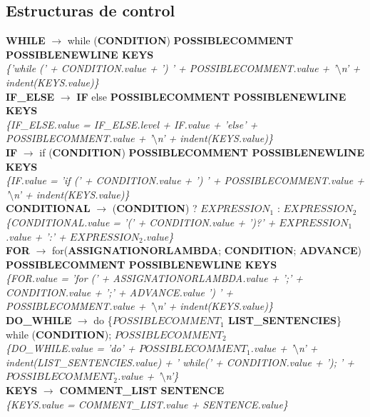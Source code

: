 \documentclass[10pt,a4paper]{article}
\begin{document}
\subsection{Estructuras de control}
\textbf{WHILE} $\rightarrow$ while (\textbf{CONDITION}) \textbf{POSSIBLECOMMENT POSSIBLENEWLINE KEYS} \\
\textit{\{'while (' + CONDITION.value + ') ' + POSSIBLECOMMENT.value + '$\setminus$n' + indent(KEYS.value)\}} \\

\textbf{IF\_ELSE} $\rightarrow$ \textbf{IF} else \textbf{POSSIBLECOMMENT POSSIBLENEWLINE KEYS} \\
\textit{\{IF\_ELSE.value = IF\_ELSE.level + IF.value + 'else' + POSSIBLECOMMENT.value + '$\setminus$n' + indent(KEYS.value)\}} \\

\textbf{IF} $\rightarrow$ if (\textbf{CONDITION}) \textbf{POSSIBLECOMMENT POSSIBLENEWLINE KEYS} \\
\textit{\{IF.value = 'if (' + CONDITION.value + ') ' + POSSIBLECOMMENT.value + '$\setminus$n' + indent(KEYS.value)\}} \\

\textbf{CONDITIONAL} $\rightarrow$ (\textbf{CONDITION}) ? \textbf{$EXPRESSION_{1}$} : \textbf{$EXPRESSION_{2}$}  \\
\textit{\{CONDITIONAL.value = '(' + CONDITION.value + ')?' + $EXPRESSION_{1}$.value + ':' + $EXPRESSION_{2}$.value\}}\\
	
\textbf{FOR} $\rightarrow$ for(\textbf{ASSIGNATIONORLAMBDA}; \textbf{CONDITION}; \textbf{ADVANCE}) \textbf{POSSIBLECOMMENT POSSIBLENEWLINE KEYS}  \\
\textit{\{FOR.value = 'for (' + ASSIGNATIONORLAMBDA.value + ';' + CONDITION.value + ';' + ADVANCE.value ') ' + POSSIBLECOMMENT.value + '$\setminus$n' + indent(KEYS.value)\}}\\

\textbf{DO\_WHILE} $\rightarrow$ do \{\textbf{$POSSIBLECOMMENT_{1}$ LIST\_SENTENCIES}\} while (\textbf{CONDITION}); \textbf{$POSSIBLECOMMENT_{2}$} \\
\textit{\{DO\_WHILE.value = 'do{' + $POSSIBLECOMMENT_{1}$.value + '$\setminus$n' + indent(LIST\_SENTENCIES.value) + '} while(' + CONDITION.value + '); ' + $POSSIBLECOMMENT_{2}$.value + '$\setminus$n'\}}\\

\textbf{KEYS} $\rightarrow$ \textbf{COMMENT\_LIST SENTENCE} \\ 
\textit{\{KEYS.value = COMMENT\_LIST.value + SENTENCE.value\}} \\
\end{document}
